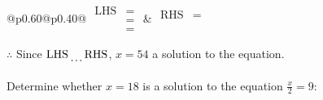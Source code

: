 \documentclass[12pt]{article}
\newcounter{minipagecount}
\begin{document}
\begin{multicols}{2}
\begin{minipage}[t]{0.40\textwidth}
    \noindent
    \renewcommand{\arraystretch}{1.3} %
    \begin{tabular}{@{}p{0.60\linewidth}@{}p{0.40\linewidth}@{}}
        \(\begin{aligned}
            \text{LHS} &=  \\
                    &=  \\
                    &= 
        \end{aligned}\) &
        \(\begin{aligned}
            \text{RHS} &= \\
                    & \\
                    &
        \end{aligned}\)
    \end{tabular}
    \renewcommand{\arraystretch}{1.0} %
    \vspace{2pt}  %

    \noindent \(\therefore\) Since \(\text{LHS} \dotuline{\hspace{5mm}} \text{RHS}\), \(x = 54\) \dotuline{\hspace{12mm}} a solution to the equation.

\end{minipage}

\vspace*{0.5ex}
\vfill{}
\noindent{(\theminipagecount)}\hspace{0.1mm} %
\begin{minipage}[t]{0.40\textwidth} %

    \noindent Determine whether \(x = 18\) is a solution to the equation \(\frac{x}{2} = 9\):
    \vspace{2pt}  %


\end{minipage}
\end{multicols}
\end{document}
